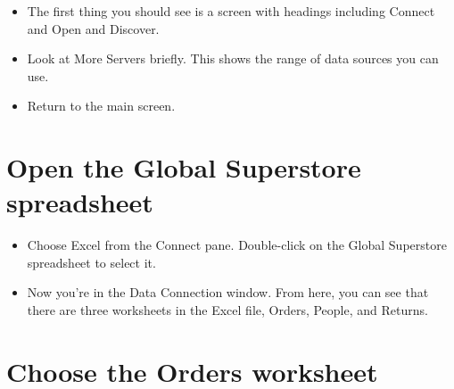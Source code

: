 \begin{itemize}
\item
  The first thing you should see is a screen with headings including
  Connect and Open and Discover.
\item
  Look at More Servers briefly. This shows the range of data sources you
  can use.
\item
  Return to the main screen.
\end{itemize}

\section{Open the Global Superstore
spreadsheet}\label{open-the-global-superstore-spreadsheet}

\begin{itemize}
\item
  Choose Excel from the Connect pane. Double-click on the Global
  Superstore spreadsheet to select it.
\item
  Now you're in the Data Connection window. From here, you can see that
  there are three worksheets in the Excel file, Orders, People, and
  Returns.
\end{itemize}

\section{Choose the Orders worksheet}\label{choose-the-orders-worksheet}

